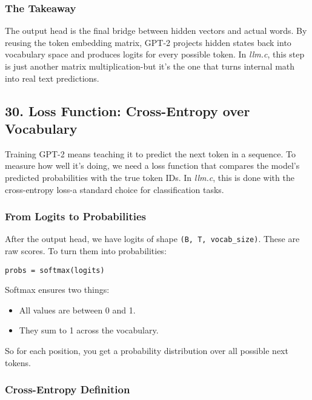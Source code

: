 \documentclass[
  letterpaper,
  DIV=11,
  numbers=noendperiod]{scrreprt}
\providecommand{\tightlist}{%
  \setlength{\itemsep}{0pt}\setlength{\parskip}{0pt}}
\begin{document}
\subsubsection{The Takeaway}\label{the-takeaway-18}

The output head is the final bridge between hidden vectors and actual
words. By reusing the token embedding matrix, GPT-2 projects hidden
states back into vocabulary space and produces logits for every possible
token. In \emph{llm.c}, this step is just another matrix
multiplication-but it's the one that turns internal math into real text
predictions.

\subsection{30. Loss Function: Cross-Entropy over
Vocabulary}\label{loss-function-cross-entropy-over-vocabulary}

Training GPT-2 means teaching it to predict the next token in a
sequence. To measure how well it's doing, we need a loss function that
compares the model's predicted probabilities with the true token IDs. In
\emph{llm.c}, this is done with the cross-entropy loss-a standard choice
for classification tasks.

\subsubsection{From Logits to
Probabilities}\label{from-logits-to-probabilities}

After the output head, we have logits of shape
\texttt{(B,\ T,\ vocab\_size)}. These are raw scores. To turn them into
probabilities:

\begin{verbatim}
probs = softmax(logits)
\end{verbatim}

Softmax ensures two things:

\begin{itemize}
\tightlist
\item
  All values are between 0 and 1.
\item
  They sum to 1 across the vocabulary.
\end{itemize}

So for each position, you get a probability distribution over all
possible next tokens.

\subsubsection{Cross-Entropy Definition}\label{cross-entropy-definition}
\end{document}
